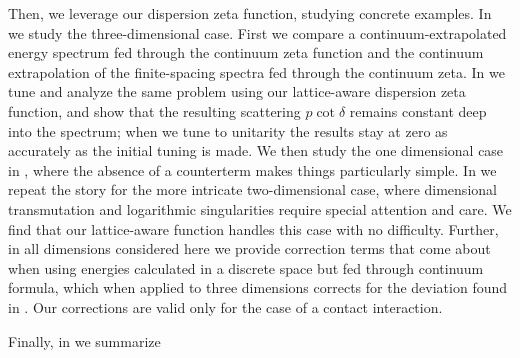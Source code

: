 Then, we leverage our dispersion zeta function, studying concrete examples.
In  we study the three-dimensional case.
First we compare a continuum-extrapolated energy spectrum fed through the continuum zeta function and the continuum extrapolation of the finite-spacing spectra fed through the continuum zeta.
In  we tune and analyze the same problem using our lattice-aware dispersion zeta function, and show that the resulting scattering $p\cot\delta$ remains constant deep into the spectrum; when we tune to unitarity the results stay at zero as accurately as the initial tuning is made.
We then study the one dimensional case in , where the absence of a counterterm makes things particularly simple.
In  we repeat the story for the more intricate two-dimensional case, where dimensional transmutation and logarithmic singularities require special attention and care.
We find that our lattice-aware \Luscher function handles this case with no difficulty.  Further, in all dimensions considered here we provide correction terms that come about when using energies calculated in a discrete space but fed through continuum \Luscher formula, which when applied to three dimensions corrects for the deviation found in .  Our corrections are valid only for the case of a contact interaction.

Finally, in  we summarize 
